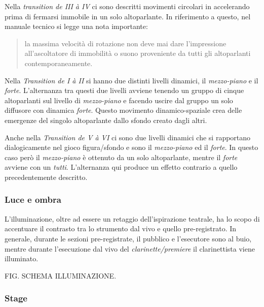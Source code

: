 \begin{table*}[h]
\begin{center}
\begin{tabular}{c c c c c}
\end{tabular}
\end{center}
\label{tab:diffiv-v}

\end{table*}

Nella \emph{transition de III à IV} ci sono descritti movimenti circolari in accelerando prima di fermarsi immobile in un solo altoparlante. In riferimento a questo, nel manuale tecnico si legge una nota importante:

\begin{quote}
{\small la massima velocità di rotazione non deve mai dare l'impressione all'ascoltatore di immobilità o suono proveniente da tutti gli altoparlanti contemporaneamente.
}
\end{quote}

Nella \emph{Transition de I à II} si hanno due distinti livelli dinamici, il \emph{mezzo-piano} e il \emph{forte}. L'alternanza tra questi due livelli avviene tenendo un gruppo di cinque altoparlanti sul livello di \emph{mezzo-piano} e facendo uscire dal gruppo un solo diffusore con dinamica \emph{forte}. Questo movimento dinamico-spaziale crea delle emergenze del singolo altoparlante dallo sfondo creato dagli altri.

Anche nella \emph{Transition de V à VI} ci sono due livelli dinamici che si rapportano dialogicamente nel gioco figura/sfondo e sono il \emph{mezzo-piano} ed il \emph{forte}. In questo caso però il \emph{mezzo-piano} è ottenuto da un solo altoparlante, mentre il \emph{forte} avviene con un \emph{tutti}. L'alternanza qui produce un effetto contrario a quello precedentemente descritto.

\subsubsection{Luce e ombra}

L'illuminazione, oltre ad essere un retaggio dell'ispirazione teatrale, ha lo scopo di accentuare il contrasto tra lo strumento dal vivo e quello pre-registrato. In generale, durante le sezioni pre-registrate, il pubblico e l'esecutore sono al buio, mentre durante l'esecuzione dal vivo del \emph{clarinette/premiere} il clarinettista viene illuminato.

FIG. SCHEMA ILLUMINAZIONE.

\subsubsection{Stage}

